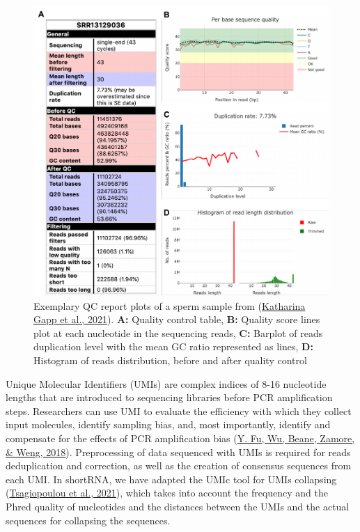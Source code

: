 \documentclass[12pt,twoside]{reedthesis}
\begin{document}
\begin{figure}[H]

{\centering \includegraphics{thesis_files/figure-latex/3f4-1} 

}

\caption{Exemplary QC report plots of a sperm sample from (\protect\hyperlink{ref-gapp2021}{Katharina Gapp et al., 2021}). \textbf{A:} Quality control table, \textbf{B:} Quality score lines plot at each nucleotide in the sequencing reads, \textbf{C:} Barplot of reads duplication level with the mean GC ratio represented as lines, \textbf{D:} Histogram of reads distribution, before and after quality control}\label{fig:3f4}
\end{figure}
Unique Molecular Identifiers (UMIs) are complex indices of 8-16
nucleotide lengths that are introduced to sequencing libraries before
PCR amplification steps. Researchers can use UMI to evaluate the
efficiency with which they collect input molecules, identify sampling
bias, and, most importantly, identify and compensate for the effects of
PCR amplification bias (\protect\hyperlink{ref-fu2018}{Y. Fu, Wu, Beane, Zamore, \& Weng, 2018}). Preprocessing of data sequenced with
UMIs is required for reads deduplication and correction, as well as the
creation of consensus sequences from each UMI. In shortRNA, we have
adapted the UMIc tool for UMIs collapsing (\protect\hyperlink{ref-tsagiopoulou2021}{Tsagiopoulou et al., 2021}), which
takes into account the frequency and the Phred quality of nucleotides
and the distances between the UMIs and the actual sequences for
collapsing the sequences.
\end{document}
